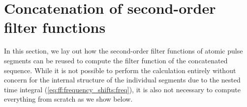 \section{Concatenation of second-order filter functions}\label{sec:app:ff:concatenation}
In this section, we lay out how the second-order filter functions of atomic pulse segments can be reused to compute the filter function of the concatenated sequence.
While it is not possible to perform the calculation entirely without concern for the internal structure of the individual segments due to the nested time integral (\cf \cref{eq:ff:frequency_shifts:freq}), it is also not necessary to compute everything from scratch as we show below.

